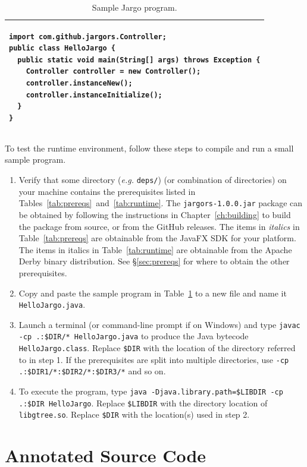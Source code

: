 \begin{table}
\small
\centering
\caption{Sample Jargo program.}
\label{tab:sample}
\begin{tabular}{|p{}|}
\hline
\begin{verbatim}
import com.github.jargors.Controller;
public class HelloJargo {
  public static void main(String[] args) throws Exception {
    Controller controller = new Controller();
    controller.instanceNew();
    controller.instanceInitialize();
  }
}
\end{verbatim}\\
\hline
\end{tabular}
\end{table}

To test the runtime environment, follow these steps to compile and run a small
sample program.
\begin{enumerate}
\item Verify that some directory (\textit{e.g.} \texttt{deps/}) (or combination
of directories) on your machine contains the prerequisites listed in
Tables~\ref{tab:prereqs}~and~\ref{tab:runtime}.  The \texttt{jargors-1.0.0.jar}
package can be obtained by following the instructions in
Chapter~\ref{ch:building} to build the package from source, or from the GitHub
releases.  The items in \textit{italics} in Table~\ref{tab:prereqs} are
obtainable from the JavaFX SDK for your platform. The items in italics in
Table~\ref{tab:runtime} are obtainable from the Apache Derby binary
distribution. See \S\ref{sec:prereqs} for where to obtain the other
prerequisites.
\item Copy and paste the sample program in Table~\ref{tab:sample} to a new file
and name it \texttt{HelloJargo.java}.
\item Launch a terminal (or command-line prompt if on Windows) and type
\texttt{javac -cp .:\$DIR/* HelloJargo.java} to produce the Java bytecode
\texttt{HelloJargo.class}. Replace \texttt{\$DIR} with the location of the
directory referred to in step 1. If the prerequisites are split into
multiple directories, use \texttt{-cp .:\$DIR1/*:\$DIR2/*:\$DIR3/*} and so on.
\item To execute the program, type
\texttt{java -Djava.library.path=\$LIBDIR -cp .:\$DIR HelloJargo}. Replace
\texttt{\$LIBDIR} with the directory location of \texttt{libgtree.so}.
Replace \texttt{\$DIR} with the location(s) used in step 2.
\end{enumerate}
\nwenddocs{}\part{Annotated Source Code}
